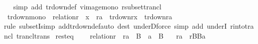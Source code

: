 \begin{isabellebody}
%
\isadelimproof
\ \ %
\endisadelimproof
%
\isatagproof
{}\isamarkupfalse%
{\isacharparenleft}{\kern0pt}simp\ add{\isacharcolon}{\kern0pt}\ tr{\isacharunderscore}{\kern0pt}down{\isacharunderscore}{\kern0pt}def\ vimage{\isacharunderscore}{\kern0pt}mono\ r{\isacharunderscore}{\kern0pt}subset{\isacharunderscore}{\kern0pt}trancl{\isacharparenright}{\kern0pt}%
\endisatagproof
{\isafoldproof}%
%
\isadelimproof
\isanewline
%
\endisadelimproof
\isanewline
{}\isamarkupfalse%
\ tr{\isacharunderscore}{\kern0pt}down{\isacharunderscore}{\kern0pt}mono\ {\isacharcolon}{\kern0pt}\ {\isachardoublequoteopen}relation{\isacharparenleft}{\kern0pt}r{\isacharparenright}{\kern0pt}\ {\isasymLongrightarrow}\ x\ {\isasymin}\ r{\isacharminus}{\kern0pt}{\isacharbackquote}{\kern0pt}{\isacharbackquote}{\kern0pt}{\isacharbraceleft}{\kern0pt}a{\isacharbraceright}{\kern0pt}\ {\isasymLongrightarrow}\ tr{\isacharunderscore}{\kern0pt}down{\isacharparenleft}{\kern0pt}r{\isacharcomma}{\kern0pt}x{\isacharparenright}{\kern0pt}\ {\isasymsubseteq}\ tr{\isacharunderscore}{\kern0pt}down{\isacharparenleft}{\kern0pt}r{\isacharcomma}{\kern0pt}a{\isacharparenright}{\kern0pt}{\isachardoublequoteclose}\isanewline
%
\isadelimproof
\ \ %
\endisadelimproof
%
\isatagproof
{}\isamarkupfalse%
{\isacharparenleft}{\kern0pt}rule\ subsetI{\isacharcomma}{\kern0pt}simp\ add{\isacharcolon}{\kern0pt}tr{\isacharunderscore}{\kern0pt}down{\isacharunderscore}{\kern0pt}def{\isacharcomma}{\kern0pt}auto\ dest{\isacharcolon}{\kern0pt}\ underD{\isacharcomma}{\kern0pt}force\ simp\ add{\isacharcolon}{\kern0pt}\ underI\ r{\isacharunderscore}{\kern0pt}into{\isacharunderscore}{\kern0pt}trancl\ trancl{\isacharunderscore}{\kern0pt}trans{\isacharparenright}{\kern0pt}%
\endisatagproof
{\isafoldproof}%
%
\isadelimproof
\isanewline
%
\endisadelimproof
\isanewline
{}\isamarkupfalse%
\ rest{\isacharunderscore}{\kern0pt}eq\ {\isacharcolon}{\kern0pt}\isanewline
\ \ \ {\isachardoublequoteopen}relation{\isacharparenleft}{\kern0pt}r{\isacharparenright}{\kern0pt}{\isachardoublequoteclose}\ \ {\isachardoublequoteopen}r{\isacharminus}{\kern0pt}{\isacharbackquote}{\kern0pt}{\isacharbackquote}{\kern0pt}{\isacharbraceleft}{\kern0pt}a{\isacharbraceright}{\kern0pt}\ {\isasymsubseteq}\ B{\isachardoublequoteclose}\ \ {\isachardoublequoteopen}a\ {\isasymin}\ B{\isachardoublequoteclose}\isanewline
\ \ \ {\isachardoublequoteopen}r{\isacharminus}{\kern0pt}{\isacharbackquote}{\kern0pt}{\isacharbackquote}{\kern0pt}{\isacharbraceleft}{\kern0pt}a{\isacharbraceright}{\kern0pt}\ {\isacharequal}{\kern0pt}\ {\isacharparenleft}{\kern0pt}r{\isasyminter}B{\isasymtimes}B{\isacharparenright}{\kern0pt}{\isacharminus}{\kern0pt}{\isacharbackquote}{\kern0pt}{\isacharbackquote}{\kern0pt}{\isacharbraceleft}{\kern0pt}a{\isacharbraceright}{\kern0pt}{\isachardoublequoteclose}\isanewline

\end{isabellebody}
